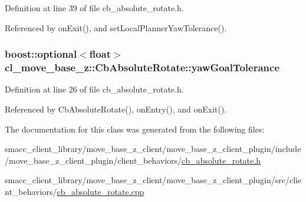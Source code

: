 Definition at line 39 of file cb\+\_\+absolute\+\_\+rotate.\+h.



Referenced by on\+Exit(), and set\+Local\+Planner\+Yaw\+Tolerance().

\subsubsection[{\texorpdfstring{yaw\+Goal\+Tolerance}{yawGoalTolerance}}]{\setlength{\rightskip}{0pt plus 5cm}boost\+::optional$<$float$>$ cl\+\_\+move\+\_\+base\+\_\+z\+::\+Cb\+Absolute\+Rotate\+::yaw\+Goal\+Tolerance}\hypertarget{classcl__move__base__z_1_1CbAbsoluteRotate_a8d8b5b9c2c821efe101bb07c96c4bdd3}{}\label{classcl__move__base__z_1_1CbAbsoluteRotate_a8d8b5b9c2c821efe101bb07c96c4bdd3}


Definition at line 26 of file cb\+\_\+absolute\+\_\+rotate.\+h.



Referenced by Cb\+Absolute\+Rotate(), on\+Entry(), and on\+Exit().



The documentation for this class was generated from the following files\+:\begin{DoxyCompactItemize}
\item 
smacc\+\_\+client\+\_\+library/move\+\_\+base\+\_\+z\+\_\+client/move\+\_\+base\+\_\+z\+\_\+client\+\_\+plugin/include/move\+\_\+base\+\_\+z\+\_\+client\+\_\+plugin/client\+\_\+behaviors/\hyperlink{cb__absolute__rotate_8h}{cb\+\_\+absolute\+\_\+rotate.\+h}\item 
smacc\+\_\+client\+\_\+library/move\+\_\+base\+\_\+z\+\_\+client/move\+\_\+base\+\_\+z\+\_\+client\+\_\+plugin/src/client\+\_\+behaviors/\hyperlink{cb__absolute__rotate_8cpp}{cb\+\_\+absolute\+\_\+rotate.\+cpp}\end{DoxyCompactItemize}
